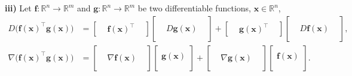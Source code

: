 \documentclass[12pt,thmsa]{article}
\begin{document}
\noindent
\textbf{iii)} Let \( \boldsymbol{f}: \mathbb{R}^{n} \rightarrow \mathbb{R}^{m}\) and \( \boldsymbol{g}: \mathbb{R}^{n} \rightarrow \mathbb{R}^{m}\) be two differentiable functions, \(\boldsymbol{x} \in \mathbb{R}^{n}\),
\[ 
\begin{aligned}
	D \bigg (\boldsymbol{f}(\boldsymbol{x})^{\top} \boldsymbol{g}(\boldsymbol{x}) \bigg )
	& = \left[ \begin{array}{ccc} & \boldsymbol{f}(\boldsymbol{x})^{\top} & \end{array} \right]
		\left[ \begin{array}{ccc} & & \\ & D \boldsymbol{g}(\boldsymbol{x}) & \\ & & \end{array} \right]
		+ \left[ \begin{array}{ccc} & \boldsymbol{g}(\boldsymbol{x})^{\top} & \end{array} \right]
		\left[ \begin{array}{ccc} & & \\ & 	D \boldsymbol{f}(\boldsymbol{x})  & \\ & & \end{array} \right], \\
	\nabla \bigg (\boldsymbol{f}(\boldsymbol{x})^{\top} \boldsymbol{g}(\boldsymbol{x}) \bigg )
	& = \left[ \begin{array}{ccc} & & \\ &  \nabla \boldsymbol{f}(\boldsymbol{x}) & \\ & & \end{array} \right]
		\left[\begin{array}{c}\\  \boldsymbol{g}(\boldsymbol{x}) \\  \\ \end{array} \right ] 
   		+ \left[ \begin{array}{ccc} & & \\ &  \nabla \boldsymbol{g} (\boldsymbol{x}) & \\ & & \end{array} \right]
   		\left[\begin{array}{c}\\  \boldsymbol{f}(\boldsymbol{x}) \\  \\ \end{array} \right] . \\
\end{aligned}
\]
\end{document}
